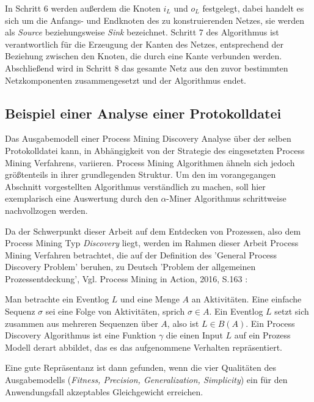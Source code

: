 In Schritt 6 werden außerdem die Knoten $i_L$ und $o_L$ festgelegt, dabei handelt es sich um die Anfangs- und Endknoten des zu konstruierenden Netzes, sie werden als \textit{Source} beziehungsweise \textit{Sink} bezeichnet. Schritt 7 des Algorithmus ist verantwortlich für die Erzeugung der Kanten des Netzes, entsprechend der Beziehung zwischen den Knoten, die durch eine Kante verbunden werden. Abschließend wird in Schritt 8 das gesamte Netz aus den zuvor bestimmten Netzkomponenten zusammengesetzt und der Algorithmus endet.
\newpage
\subsection{Beispiel einer Analyse einer Protokolldatei}
Das Ausgabemodell einer Process Mining Discovery Analyse über der selben Protokolldatei kann, in Abhängigkeit von der Strategie des eingesetzten Process Mining Verfahrens, variieren. Process Mining Algorithmen ähneln sich jedoch größtenteils in ihrer grundlegenden Struktur. Um den im vorangegangen Abschnitt vorgestellten Algorithmus verständlich zu machen, soll hier exemplarisch eine Auswertung durch den $\alpha$-Miner Algorithmus schrittweise nachvollzogen werden.

Da der Schwerpunkt dieser Arbeit auf dem Entdecken von Prozessen, also dem Process Mining Typ \textit{ Discovery} liegt, werden im Rahmen dieser Arbeit Process Mining Verfahren betrachtet, die auf der Definition des 'General Process Discovery Problem' beruhen, zu Deutsch 'Problem der allgemeinen Prozessentdeckung', Vgl. Process Mining in Action, 2016, S.163 \cite{PMinAction}:
\begin{addmargin}[20pt]{20pt} 
Man betrachte ein Eventlog $L$ und eine Menge $A$ an Aktivitäten. Eine einfache Sequenz $\sigma$ sei eine Folge von Aktivitäten, sprich $\sigma ∈ A $. Ein Eventlog $L$ setzt sich zusammen aus mehreren Sequenzen über $A$, also ist $L ∈ B(A)$. Ein Process Discovery Algorithmus ist eine Funktion $\gamma$ die einen Input $L$ auf ein Prozess Modell derart abbildet, das es das aufgenommene Verhalten repräsentiert.
\end{addmargin}
Eine gute Repräsentanz ist dann gefunden, wenn die vier Qualitäten des Ausgabemodells (\textit{Fitness, Precision, Generalization, Simplicity}) ein für den Anwendungsfall akzeptables Gleichgewicht erreichen.

